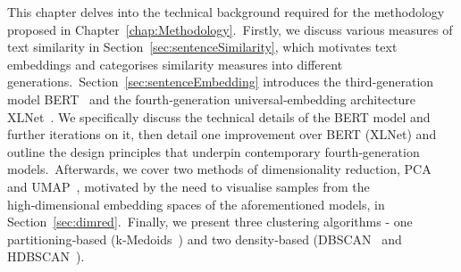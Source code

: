 \documentclass[10pt,oneside]{report}
\begin{document}
This chapter delves into the technical background required for the methodology proposed in Chapter \ref{chap:Methodology}. Firstly, we discuss various measures of text similarity in Section \ref{sec:sentenceSimilarity}, which motivates text embeddings and categorises similarity measures into different generations. Section \ref{sec:sentenceEmbedding} introduces the third‑generation model BERT \cite{devlin2019bert} and the fourth‑generation universal‐embedding architecture XLNet \cite{yang2019xlnet}. We specifically discuss the technical details of the BERT model and further iterations on it, then detail one improvement over BERT (XLNet) and outline the design principles that underpin contemporary fourth‑generation models. Afterwards, we cover two methods of dimensionality reduction,  PCA \cite{pearson1901liii,hotelling1933analysis} and UMAP \cite{mcinnes2018umap}, motivated by the need to visualise samples from the high‑dimensional embedding spaces of the aforementioned models, in Section \ref{sec:dimred}. Finally, we present three clustering algorithms - one partitioning‑based (k‑Medoids \cite{kmedoids}) and two density‑based (DBSCAN \cite{ester1996density} and HDBSCAN \cite{campello2013density}).



\end{document}
